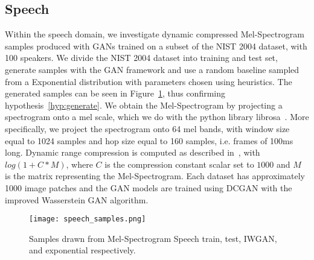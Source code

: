 \subsection{Speech}
Within the speech domain, we investigate dynamic compressed Mel-Spectrogram 
samples produced with GANs trained on a subset of the NIST 2004 dataset, with
100 speakers. We divide the NIST 2004 dataset into training and test set,
generate samples with the GAN framework and use a random baseline sampled from 
a Exponential distribution with parameters chosen using heuristics.
The generated samples can be seen in
Figure~\ref{fig:speech_samples}, thus confirming hypothesis~\ref{hyp:generate}.
We obtain the Mel-Spectrogram by projecting a
spectrogram onto a mel scale, which we do with the python library
librosa~\cite{mcfee2015librosa}. More specifically,  we project the spectrogram 
onto 64 mel bands,
with window size equal to 1024 samples and hop size equal to 160 samples, i.e.
frames of 100ms long. Dynamic range compression is computed as described 
in~\cite{lukic2016speaker}, with $log(1 + C*M)$, where $C$ is the compression 
constant scalar set to $1000$ and $M$ is the matrix representing the Mel-Spectrogram.
Each dataset has approximately 1000 image patches and the GAN models are trained 
using DCGAN with the improved Wasserstein GAN algorithm.

\begin{figure}[!h]
  \begin{center}
  \texttt{[image: speech\_samples.png]}
  \caption{Samples drawn from Mel-Spectrogram Speech train, test,
IWGAN, and exponential respectively.}
  \label{fig:speech_samples}
  \end{center}
\end{figure}

